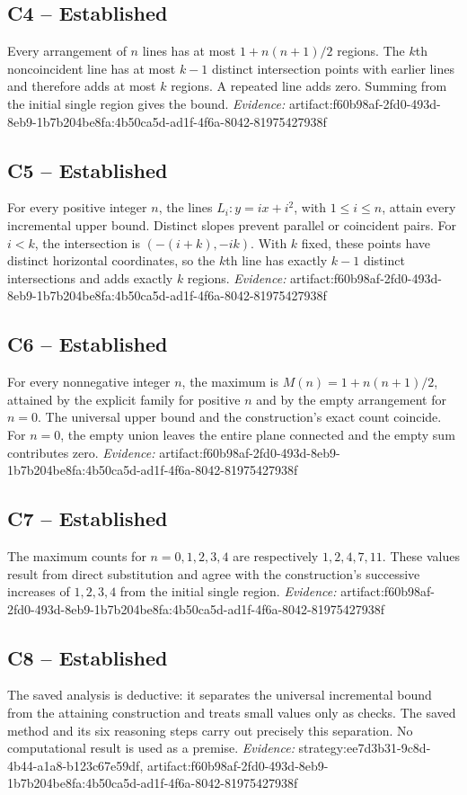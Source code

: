 \documentclass[11pt]{article}
\begin{document}
\subsection{C4 -- Established}
Every arrangement of $n$ lines has at most $1+n(n+1)/2$ regions.
The $k$th noncoincident line has at most $k-1$ distinct intersection points with earlier lines and therefore adds at most $k$ regions. A repeated line adds zero. Summing from the initial single region gives the bound.
\textit{Evidence: }artifact:f60b98af-2fd0-493d-8eb9-1b7b204be8fa:4b50ca5d-ad1f-4f6a-8042-81975427938f
\subsection{C5 -- Established}
For every positive integer $n$, the lines $L_i:y=ix+i^2$, with $1\leq i\leq n$, attain every incremental upper bound.
Distinct slopes prevent parallel or coincident pairs. For $i<k$, the intersection is $(-(i+k),-ik)$. With $k$ fixed, these points have distinct horizontal coordinates, so the $k$th line has exactly $k-1$ distinct intersections and adds exactly $k$ regions.
\textit{Evidence: }artifact:f60b98af-2fd0-493d-8eb9-1b7b204be8fa:4b50ca5d-ad1f-4f6a-8042-81975427938f
\subsection{C6 -- Established}
For every nonnegative integer $n$, the maximum is $M(n)=1+n(n+1)/2$, attained by the explicit family for positive $n$ and by the empty arrangement for $n=0$.
The universal upper bound and the construction's exact count coincide. For $n=0$, the empty union leaves the entire plane connected and the empty sum contributes zero.
\textit{Evidence: }artifact:f60b98af-2fd0-493d-8eb9-1b7b204be8fa:4b50ca5d-ad1f-4f6a-8042-81975427938f
\subsection{C7 -- Established}
The maximum counts for $n=0,1,2,3,4$ are respectively $1,2,4,7,11$.
These values result from direct substitution and agree with the construction's successive increases of $1,2,3,4$ from the initial single region.
\textit{Evidence: }artifact:f60b98af-2fd0-493d-8eb9-1b7b204be8fa:4b50ca5d-ad1f-4f6a-8042-81975427938f
\subsection{C8 -- Established}
The saved analysis is deductive: it separates the universal incremental bound from the attaining construction and treats small values only as checks.
The saved method and its six reasoning steps carry out precisely this separation. No computational result is used as a premise.
\textit{Evidence: }strategy:ee7d3b31-9c8d-4b44-a1a8-b123c67e59df, artifact:f60b98af-2fd0-493d-8eb9-1b7b204be8fa:4b50ca5d-ad1f-4f6a-8042-81975427938f
\end{document}
